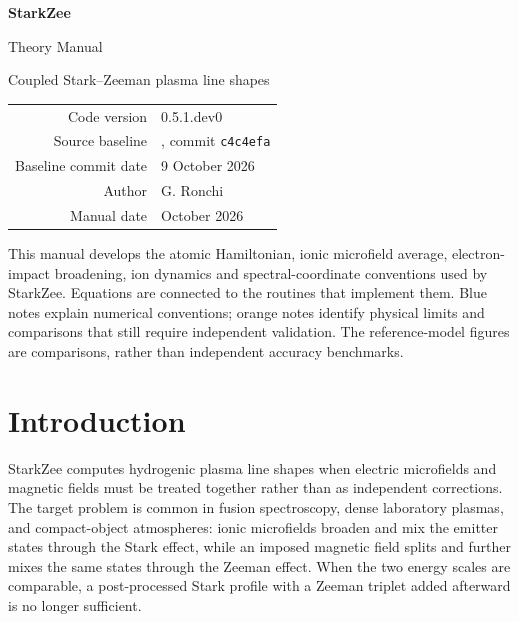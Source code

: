 \documentclass[11pt,a4paper]{article}
\newcommand{\code}[1]{\texttt{\detokenize{#1}}}
\providecommand{\revision}{\texttt{c4c4efa}}
\numberwithin{equation}{section}
\begin{document}
\hypersetup{pageanchor=false}
\begin{titlepage}
\centering
\vspace*{3cm}
{\Huge\bfseries StarkZee\par}
\vspace{0.6cm}
{\LARGE Theory Manual\par}
\vspace{0.4cm}
{\large Coupled Stark--Zeeman plasma line shapes\par}
\vspace{2cm}
\begin{tabular}{rl}
Code version & 0.5.1.dev0\\
Source baseline & \code{main}, commit \revision\\
Baseline commit date & 9 October 2026\\
Author & G. Ronchi\\
Manual date & October 2026
\end{tabular}
\vfill
\begin{minipage}{0.82\textwidth}\small
This manual develops the atomic Hamiltonian, ionic microfield average,
electron-impact broadening, ion dynamics and spectral-coordinate conventions
used by StarkZee. Equations are connected to the routines that implement them.
Blue notes explain numerical conventions; orange notes identify physical limits
and comparisons that still require independent validation. The reference-model
figures are comparisons, rather than independent accuracy benchmarks.
\end{minipage}
\vspace{1.5cm}
\end{titlepage}
\hypersetup{pageanchor=true}
\begingroup\footnotesize\setlength{\parskip}{0pt}\tableofcontents\endgroup
\clearpage{}

\section{Introduction}
StarkZee computes hydrogenic plasma line shapes when electric microfields and magnetic fields must be treated together rather than as independent corrections.  The target problem is common in fusion spectroscopy, dense laboratory plasmas, and compact-object atmospheres: ionic microfields broaden and mix the emitter states through the Stark effect, while an imposed magnetic field splits and further mixes the same states through the Zeeman effect.  When the two energy scales are comparable, a post-processed Stark profile with a Zeeman triplet added afterward is no longer sufficient.
\end{document}
